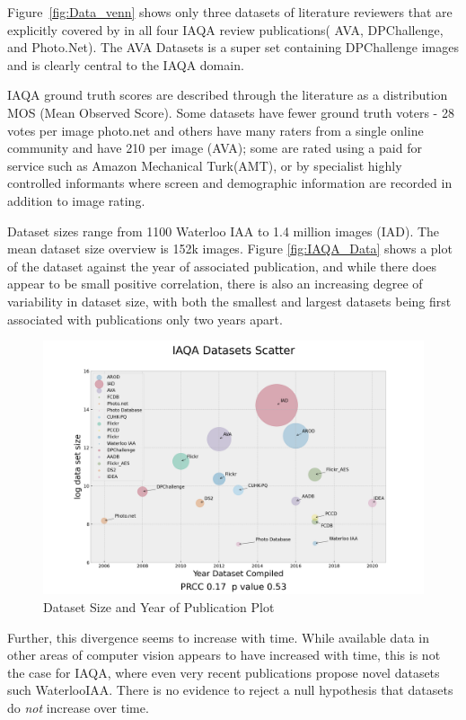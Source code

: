 Figure~\ref{fig:Data_venn} shows only three datasets of literature reviewers that are explicitly covered by in all four IAQA review publications( AVA, DPChallenge, and Photo.Net). The AVA Datasets is a super set containing DPChallenge images and is clearly central to the IAQA domain.

IAQA ground truth scores are described through the literature as a distribution MOS (Mean Observed Score). Some datasets have fewer ground truth voters - 28 votes per image photo.net \cite{Murray2012, Wu2011} and others have many raters from a single online community and have 210 per image (AVA); some are rated using a paid for service such as Amazon Mechanical Turk(AMT), or by specialist highly controlled informants where screen and demographic information are recorded in addition to image rating. 
 
 Dataset sizes range from 1100\cite{Liu2017a} Waterloo IAA to 1.4 million\cite{Lu2015a} images (IAD). The mean dataset size overview is 152k images. Figure \ref{fig:IAQA_Data} shows a plot of the dataset against the year of associated publication, and while there does appear to be small positive correlation, there is also an increasing degree of variability in dataset size, with both the smallest and largest datasets being first associated with publications only two years apart.
 \begin{figure}[ht!]
 \hrulefill
 \begin{center}
 \includegraphics[height=0.55\textwidth]{figures/data_plots/iaqa_ds_size.png}
  \caption{\label{fig:IAQA_Data} Dataset Size and Year of Publication Plot}
  \label{fig:IAQA_Data_}
\hrulefill
 \end{center}
\end{figure}
 Further, this divergence seems to increase with time. While available data in other areas of computer vision appears to have increased with time, this is not the case for IAQA, where even very recent publications propose novel datasets such WaterlooIAA\cite{Liu2017}. There is no evidence to reject a null hypothesis that datasets do \textit{not} increase over time.
 
